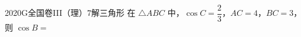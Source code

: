 
\begin{problem}{2020}{G}{全国卷III（理）}{7}{解三角形}
在 $ \triangle ABC $ 中，$ \cos C = \dfrac{2}{3} $，$ AC = 4 $，$ BC = 3 $，则 $ \cos B = $
\begin{choices}
\end{choices}
\end{problem}

\begin{answer}

\end{answer}

\begin{solutions}

\end{solutions}